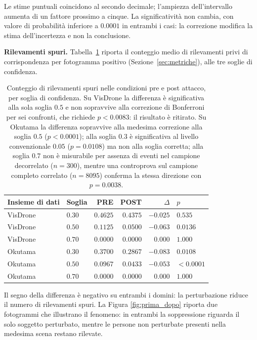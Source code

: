 \documentclass[a4paper,12pt]{report}
\begin{document}
Le stime puntuali coincidono al secondo decimale; l'ampiezza dell'intervallo aumenta di un fattore prossimo a cinque. La significatività non cambia, con valore di probabilità inferiore a $0.0001$ in entrambi i casi: la correzione modifica la stima dell'incertezza e non la conclusione.

\textbf{Rilevamenti spuri.}
\label{sec:risultato_collaterale}
Tabella~\ref{tab:collaterale} riporta il conteggio medio di rilevamenti privi di corrispondenza per fotogramma positivo (Sezione~\ref{sec:metriche}), alle tre soglie di confidenza.

\begin{table}[t]
\centering
\begin{tabular}{llrrrl}
\toprule
Insieme di dati & Soglia & PRE & POST & $\Delta$ & $p$ \\
\midrule
VisDrone & $0.30$ & $0.4625$ & $0.4375$ & $-0.025$ & $0.535$ \\
VisDrone & $0.50$ & $0.1125$ & $0.0500$ & $-0.063$ & $0.0136$ \\
VisDrone & $0.70$ & $0.0000$ & $0.0000$ & $0.000$ & $1.000$ \\
\addlinespace
Okutama & $0.30$ & $0.3700$ & $0.2867$ & $-0.083$ & $0.0108$ \\
Okutama & $0.50$ & $0.0967$ & $0.0433$ & $-0.053$ & $<0.0001$ \\
Okutama & $0.70$ & $0.0000$ & $0.0000$ & $0.000$ & $1.000$ \\
\bottomrule
\end{tabular}
\caption{Conteggio di rilevamenti spuri nelle condizioni pre e post attacco, per soglia di confidenza. Su VisDrone la differenza è significativa alla sola soglia $0.5$ e non sopravvive alla correzione di Bonferroni per sei confronti, che richiede $p < 0.0083$: il risultato è ritirato. Su Okutama la differenza sopravvive alla medesima correzione alla soglia $0.5$ ($p < 0.0001$); alla soglia $0.3$ è significativa al livello convenzionale $0.05$ ($p = 0.0108$) ma non alla soglia corretta; alla soglia $0.7$ non è misurabile per assenza di eventi nel campione decorrelato ($n = 300$), mentre una controprova sul campione completo correlato ($n = 8095$) conferma la stessa direzione con $p = 0.0038$.}
\label{tab:collaterale}
\end{table}

Il segno della differenza è negativo su entrambi i domini: la perturbazione riduce il numero di rilevamenti spuri. La Figura \ref{fig:prima_dopo} riporta due fotogrammi che illustrano il fenomeno: in entrambi la soppressione riguarda il solo soggetto perturbato, mentre le persone non perturbate presenti nella medesima scena restano rilevate.
\end{document}
